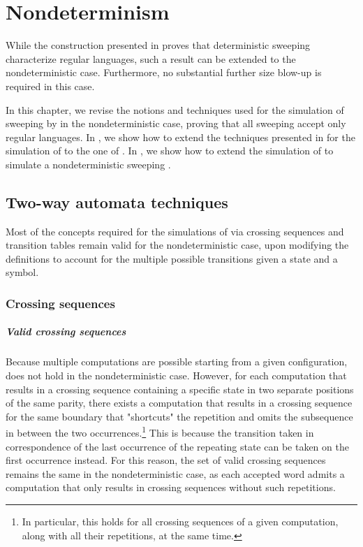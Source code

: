 \chapter{Nondeterminism}\label{ch:nondetsweep}
While the construction presented in  proves that deterministic sweeping \kLAs characterize regular languages, such a result can be extended to the nondeterministic case.
Furthermore, no substantial further size blow-up is required in this case.

In this chapter, we revise the notions and techniques used for the simulation of sweeping \kDLAs by \ONFAs in the nondeterministic case, proving that all sweeping \kLAs accept only regular languages.
In , we show how to extend the techniques presented in  for the simulation of \TDFAs to the one of \TNFAs.
In , we show how to extend the simulation of  to simulate a nondeterministic sweeping \kLA.



\section{Two-way automata techniques}\label{sec:nondet-techniques}
Most of the concepts required for the simulations of \TNFAs via crossing sequences and transition tables remain valid for the nondeterministic case, upon modifying the definitions to account for the multiple possible transitions given a state and a symbol.


\subsection{Crossing sequences}

\paragraph{Valid crossing sequences} Because multiple computations are possible starting from a given configuration,  does not hold in the nondeterministic case.
However, for each computation that results in a crossing sequence containing a specific state in two separate positions of the same parity, there exists a computation that results in a crossing sequence for the same boundary that "shortcuts" the repetition and omits the subsequence in between the two occurrences.\footnote{%
	In particular, this holds for all crossing sequences of a given computation, along with all their repetitions, at the same time.}
This is because the transition taken in correspondence of the last occurrence of the repeating state can be taken on the first occurrence instead.
For this reason, the set of valid crossing sequences remains the same in the nondeterministic case, as each accepted word admits a computation that only results in crossing sequences without such repetitions.

